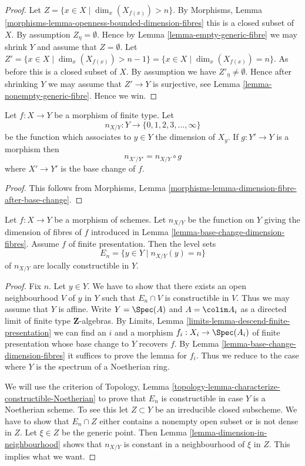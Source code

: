 \begin{proof}
Let $Z = \{x \in X \mid \dim_x(X_{f(x)}) > n \}$. By
Morphisms, Lemma \ref{morphisms-lemma-openness-bounded-dimension-fibres}
this is a closed subset of $X$. By assumption $Z_\eta = \emptyset$.
Hence by
Lemma \ref{lemma-empty-generic-fibre}
we may shrink $Y$ and assume that $Z = \emptyset$. Let
$Z' = \{x \in X \mid \dim_x(X_{f(x)}) > n - 1 \} =
\{x \in X \mid \dim_x(X_{f(x)}) = n\}$. As before this is a closed subset
of $X$. By assumption we have $Z'_\eta \not = \emptyset$. Hence after
shrinking $Y$ we may assume that $Z' \to Y$ is surjective, see
Lemma \ref{lemma-nonempty-generic-fibre}.
Hence we win.
\end{proof}

\begin{lemma}
\label{lemma-base-change-dimension-fibres}
Let $f : X \to Y$ be a morphism of finite type. Let
$$
n_{X/Y} : Y \to \{0, 1, 2, 3, \ldots, \infty\}
$$
be the function which associates to $y \in Y$ the dimension of $X_y$.
If $g : Y' \to Y$ is a morphism then
$$
n_{X'/Y'} = n_{X/Y} \circ g
$$
where $X' \to Y'$ is the base change of $f$.
\end{lemma}

\begin{proof}
This follows from
Morphisms, Lemma \ref{morphisms-lemma-dimension-fibre-after-base-change}.
\end{proof}

\begin{lemma}
\label{lemma-dimension-fibres-constructible}
Let $f : X \to Y$ be a morphism of schemes. Let
$n_{X/Y}$ be the function on $Y$ giving the dimension of fibres of $f$
introduced in
Lemma \ref{lemma-base-change-dimension-fibres}.
Assume $f$ of finite presentation. Then the level sets
$$
E_n = \{y \in Y \mid n_{X/Y}(y) = n\}
$$
of $n_{X/Y}$ are locally constructible in $Y$.
\end{lemma}

\begin{proof}
Fix $n$. Let $y \in Y$. We have to show that there exists an open neighbourhood
$V$ of $y$ in $Y$ such that $E_n \cap V$ is constructible in $V$. Thus we may
assume that $Y$ is affine. Write $Y = \Spec(A)$ and
$A = \colim A_i$ as a directed limit of finite type
$\mathbf{Z}$-algebras. By
Limits, Lemma \ref{limits-lemma-descend-finite-presentation}
we can find an $i$ and a morphism $f_i : X_i \to \Spec(A_i)$ of
finite presentation whose base change to $Y$ recovers $f$. By
Lemma \ref{lemma-base-change-dimension-fibres}
it suffices to prove the lemma for $f_i$. Thus we reduce to
the case where $Y$ is the spectrum of a Noetherian ring.

\medskip\noindent
We will use the criterion of
Topology, Lemma \ref{topology-lemma-characterize-constructible-Noetherian}
to prove that $E_n$ is constructible in case $Y$ is a Noetherian scheme.
To see this let $Z \subset Y$ be an irreducible closed subscheme.
We have to show that $E_n \cap Z$ either contains a nonempty open subset
or is not dense in $Z$. Let $\xi \in Z$ be the generic point. Then
Lemma \ref{lemma-dimension-in-neighbourhood}
shows that $n_{X/Y}$ is constant in a neighbourhood of $\xi$ in $Z$.
This implies what we want.
\end{proof}

